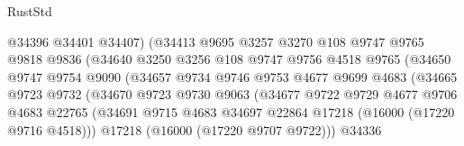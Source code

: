 \begin{lexlean}{RustStd}
\begin{coremodule}
                                  @34396
                                  @34401
                                  @34407)
                                (@34413
                                  @9695
                                  @3257
                                  @3270
                                  @108
                                  @9747
                                  @9765
                                  @9818
                                  @9836
                                  (@34640
                                    @3250
                                    @3256
                                    @108
                                    @9747
                                    @9756
                                    @4518
                                    @9765
                                    (@34650
                                      @9747
                                      @9754
                                      @9090
                                      (@34657
                                        @9734
                                        @9746
                                        @9753
                                        @4677
                                        @9699
                                        @4683
                                        (@34665
                                          @9723
                                          @9732
                                          (@34670
                                            @9723
                                            @9730
                                            @9063
                                            (@34677
                                              @9722
                                              @9729
                                              @4677
                                              @9706
                                              @4683
                                              @22765
                                              (@34691
                                                @9715
                                                @4683
                                                @34697
                                                @22864
                                                @17218
                                                (@16000 (@17220 @9716 @4518)))
                                              @17218
                                              (@16000 (@17220 @9707 @9722)))
                                            @34336

\end{coremodule}
\end{lexlean}
